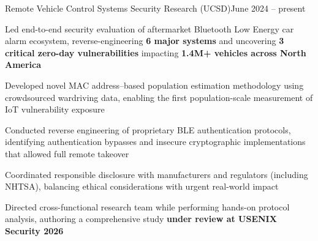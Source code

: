 \begin{joblong}{Remote Vehicle Control Systems Security Research (UCSD)}{June 2024 -- present}
	\item Led end-to-end security evaluation of aftermarket Bluetooth Low Energy car alarm ecosystem, reverse-engineering \textbf{6 major systems} and uncovering \textbf{3 critical zero-day vulnerabilities} impacting \textbf{1.4M+ vehicles across North America}
	\item Developed novel MAC address–based population estimation methodology using crowdsourced wardriving data, enabling the first population-scale measurement of IoT vulnerability exposure
	\item Conducted reverse engineering of proprietary BLE authentication protocols, identifying authentication bypasses and insecure cryptographic implementations that allowed full remote takeover
	\item Coordinated responsible disclosure with manufacturers and regulators (including NHTSA), balancing ethical considerations with urgent real-world impact
	\item Directed cross-functional research team while performing hands-on protocol analysis, authoring a comprehensive study \textbf{under review at USENIX Security 2026}
\end{joblong}
